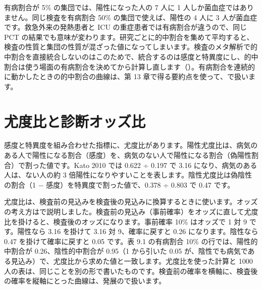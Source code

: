 \begin{kkcenter}
\end{kkcenter}

有病割合が 5\% の集団では、陽性になった人の 7 人に 1 人しか菌血症ではありません。同じ検査を有病割合 50\% の集団で使えば、陽性の 4 人に 3 人が菌血症です。救急外来の発熱患者と ICU の重症患者では有病割合が違うので、同じ PCT の結果でも意味が変わります。研究ごとに的中割合を集めて平均すると、検査の性質と集団の性質が混ざった値になってしまいます。検査のメタ解析で的中割合を直接統合しないのはこのためで、統合するのは感度と特異度にし、的中割合は使う場面の有病割合を決めてから計算し直します（）。有病割合を連続的に動かしたときの的中割合の曲線は、第 13 章で得る要約点を使って、で扱います。

\section{尤度比と診断オッズ比}
\label{sec:09-4}

感度と特異度を組み合わせた指標に、尤度比があります。陽性尤度比は、病気のある人で陽性になる割合（感度）を、病気のない人で陽性になる割合（偽陽性割合）で割った値です。Kato 2010 では 0.622 ÷ 0.197 で 3.16 になり、病気のある人は、ない人の約 3 倍陽性になりやすいことを表します。陰性尤度比は偽陰性の割合（1 − 感度）を特異度で割った値で、0.378 ÷ 0.803 で 0.47 です。

尤度比は、検査前の見込みを検査後の見込みに換算するときに使います。オッズの考え方はで説明しました。検査前の見込み（事前確率）をオッズに直して尤度比を掛けると、検査後のオッズになります。事前確率 10\% はオッズで 1 対 9 です。陽性なら 3.16 を掛けて 3.16 対 9、確率に戻すと 0.26 になります。陰性なら 0.47 を掛けて確率に戻すと 0.05 です。表 9.1 の有病割合 10\% の行では、陽性的中割合が 0.26、陰性的中割合が 0.95（1 から引いた 0.05 が、陰性でも病気である見込み）で、尤度比から求めた値と一致します。尤度比を使った計算と 1000 人の表は、同じことを別の形で書いたものです。検査前の確率を横軸に、検査後の確率を縦軸にとった曲線は、発展ので扱います。

